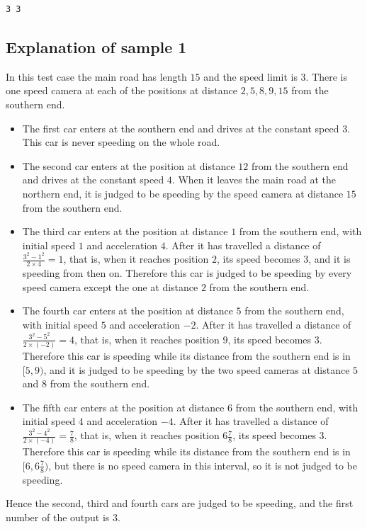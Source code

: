 \documentclass[11pt]{article}
\begin{document}
\begin{verbatim}
3 3
\end{verbatim}

\subsection*{Explanation of sample 1}

In this test case the main road has length $15$ and the speed limit is $3$.
There is one speed camera at each of the positions at distance
$2, 5, 8, 9, 15$ from the southern end.
\begin{itemize}
\item The first car enters at the southern end and drives at the constant
speed $3$.
This car is never speeding on the whole road.
\item The second car enters at the position at distance $12$ from the
southern end and drives at the constant speed $4$.
When it leaves the main road at the northern end, it is judged to be
speeding by the speed camera at distance $15$ from the southern end.
\item The third car enters at the position at distance $1$ from the
southern end, with initial speed $1$ and acceleration $4$.
After it has travelled a distance of $\frac{3^2 - 1^2}{2 \times 4} = 1$,
that is, when it reaches position $2$, its speed becomes $3$, and it is
speeding from then on.
Therefore this car is judged to be speeding by every speed camera except
the one at distance $2$ from the southern end.
\item The fourth car enters at the position at distance $5$ from the
southern end, with initial speed $5$ and acceleration $-2$.
After it has travelled a distance of
$\frac{3^2 - 5^2}{2 \times (-2)} = 4$, that is, when it reaches position
$9$, its speed becomes $3$.
Therefore this car is speeding while its distance from the southern end is
in $[5, 9)$, and it is judged to be speeding by the two speed cameras at
distance $5$ and $8$ from the southern end.
\item The fifth car enters at the position at distance $6$ from the
southern end, with initial speed $4$ and acceleration $-4$.
After it has travelled a distance of
$\frac{3^2 - 4^2}{2 \times (-4)} = \frac{7}{8}$, that is, when it reaches
position $6\frac{7}{8}$, its speed becomes $3$.
Therefore this car is speeding while its distance from the southern end is
in $[6, 6\frac{7}{8})$, but there is no speed camera in this interval, so
it is not judged to be speeding.
\end{itemize}
Hence the second, third and fourth cars are judged to be speeding, and the
first number of the output is $3$.
\end{document}
